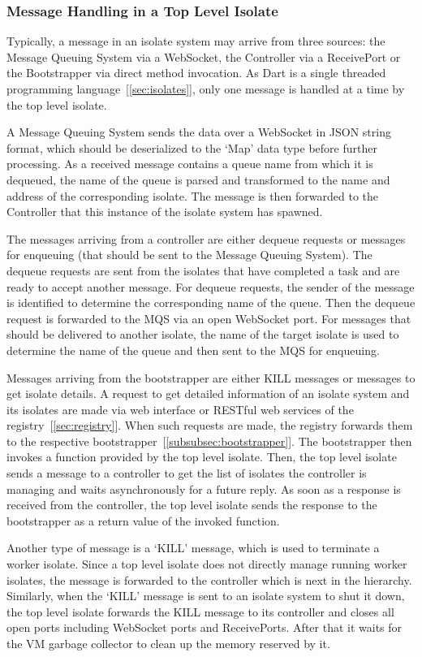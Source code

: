   \subsubsection{Message Handling in a Top Level Isolate}
  Typically, a message in an isolate system may arrive from three sources: the Message Queuing System via a WebSocket, the Controller via a ReceivePort or the Bootstrapper via direct method invocation. As Dart is a single threaded programming language~[\autoref{sec:isolates}], only one message is handled at a time by the top level isolate.

  A Message Queuing System sends the data over a WebSocket in JSON string format, which should be deserialized to the ‘Map’ data type before further processing. As a received message contains a queue name from which it is dequeued, the name of the queue is parsed and transformed to the name and address of the corresponding isolate. The message is then forwarded to the Controller that this instance of the isolate system has spawned.

  The messages arriving from a controller are either dequeue requests or messages for enqueuing (that should be sent to the Message Queuing System). The dequeue requests are sent from the isolates that have completed a task and are ready to accept another message. For dequeue requests, the sender of the message is identified to determine the corresponding name of the queue. Then the dequeue request is forwarded to the MQS via an open WebSocket port. For messages that should be delivered to another isolate, the name of the target isolate is used to determine the name of the queue and then sent to the MQS for enqueuing.

Messages arriving from the bootstrapper are either KILL messages or messages to get isolate details. A request to get detailed information of an isolate system and its isolates are made via web interface or RESTful web services of the registry~[\autoref{sec:registry}]. When such requests are made, the registry forwards them to the respective bootstrapper~[\autoref{subsubsec:bootstrapper}]. The bootstrapper then invokes a function provided by the top level isolate. Then, the top level isolate sends a message to a controller to get the list of isolates the controller is managing and waits asynchronously for a future reply. As soon as a response is received from the controller, the top level isolate sends the response to the bootstrapper as a return value of the invoked function.

  Another type of message is a ‘KILL’ message, which is used to terminate a worker isolate. Since a top level isolate does not directly manage running worker isolates, the message is forwarded to the controller which is next in the hierarchy. Similarly, when the ‘KILL’ message is sent to an isolate system to shut it down, the top level isolate forwards the KILL message to its controller and closes all open ports including WebSocket ports and ReceivePorts. After that it waits for the VM garbage collector to clean up the memory reserved by it.

